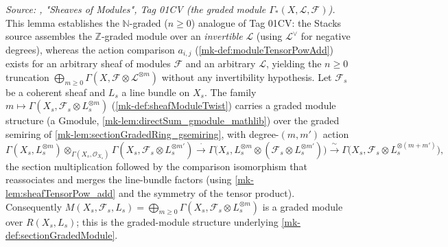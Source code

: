 \begin{lemma}\label{mk-lem:sectionGradedModule_gmodule}
  \leanok

  \textit{Source: \cite{stacks-project}, "Sheaves of Modules", Tag 01CV (the graded
  module \(\Gamma_*(X,\mathcal{L},\mathcal{F})\)).}
  This lemma establishes the \(\mathbb{N}\)-graded (\(n\ge 0\)) analogue of Tag 01CV: the
  Stacks source assembles the \(\mathbb{Z}\)-graded module over an \emph{invertible}
  \(\mathcal{L}\) (using \(\mathcal{L}^\vee\) for negative degrees), whereas the
  action comparison \(a_{i,j}\) (\ref{mk-def:moduleTensorPowAdd}) exists for an
  arbitrary sheaf of modules \(\mathcal{F}\) and an arbitrary \(\mathcal{L}\), yielding
  the \(n\ge 0\) truncation \(\bigoplus_{m\ge 0}\Gamma(X,\mathcal{F}\otimes
  \mathcal{L}^{\otimes m})\) without any invertibility hypothesis.
  Let \(\mathcal{F}_s\) be a coherent sheaf and \(L_s\) a line bundle on
  \(X_s\). The family
  \(m \mapsto \Gamma(X_s, \mathcal{F}_s \otimes L_s^{\otimes m})\)
  (\ref{mk-def:sheafModuleTwist}) carries a graded module structure (a
  \(\mathrm{Gmodule}\), \ref{mk-lem:directSum_gmodule_mathlib}) over the graded
  semiring of \ref{mk-lem:sectionGradedRing_gsemiring}, with degree-\((m,m')\)
  action
  \[
    \Gamma(X_s, L_s^{\otimes m}) \otimes_{\Gamma(X_s,\mathcal{O}_{X_s})}
      \Gamma(X_s, \mathcal{F}_s \otimes L_s^{\otimes m'})
    \xrightarrow{\ \cdot\ }
    \Gamma\bigl(X_s, L_s^{\otimes m} \otimes
      (\mathcal{F}_s \otimes L_s^{\otimes m'})\bigr)
    \xrightarrow{\ \sim\ }
    \Gamma\bigl(X_s, \mathcal{F}_s \otimes L_s^{\otimes (m+m')}\bigr),
  \]
  the section multiplication followed by the comparison isomorphism that
  reassociates and merges the line-bundle factors (using
  \ref{mk-lem:sheafTensorPow_add} and the symmetry of the tensor product).
  Consequently \(M(X_s, \mathcal{F}_s, L_s) = \bigoplus_{m \ge 0}
  \Gamma(X_s, \mathcal{F}_s \otimes L_s^{\otimes m})\) is a graded module over
  \(R(X_s, L_s)\); this is the graded-module structure underlying
  \ref{mk-def:sectionGradedModule}.
\end{lemma}


